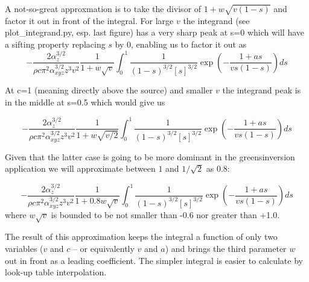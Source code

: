 \documentclass[letterpaper]{article}
\begin{document}
A not-so-great approxmation is to take the divisor of $1+w \sqrt{v(1-s)}$
and factor it out in front of the integral. For large $v$ the
integrand (see plot\_integrand.py, esp. last figure) has a very sharp peak
at s=0 which will have a sifting property replacing $s$ by $0$, enabling us to
factor it out as
\begin{equation}
-\frac{2 \alpha_{z}^{3/2}}{\rho c\pi^{2}\alpha_{xyz}^{3/2}z^{3}v^{2}} \frac{1}{1+w \sqrt{v}} \int_{0}^{1}\frac{1}{(1-s)^{3/2}\left[s\right]^{3/2}}\exp\left(-\frac{1 + as}{vs(1-s)}\right) ds
\end{equation}

At c=1 (meaning directly above the source) and smaller $v$ the integrand peak is in the middle at s=0.5 which would give us

\begin{equation}
-\frac{2 \alpha_{z}^{3/2}}{\rho c\pi^{2}\alpha_{xyz}^{3/2}z^{3}v^{2}} \frac{1}{1+w \sqrt{v/2}} \int_{0}^{1}\frac{1}{(1-s)^{3/2}\left[s\right]^{3/2}}\exp\left(-\frac{1 + as}{vs(1-s)}\right) ds
\end{equation}

Given that the latter case is going to be more dominant in the greensinversion
application we will approximate between $1$ and $1/\sqrt{2}$ as $0.8$: 

\begin{equation}
-\frac{2 \alpha_{z}^{3/2}}{\rho c\pi^{2}\alpha_{xyz}^{3/2}z^{3}v^{2}} \frac{1}{1+0.8 w \sqrt{v}} \int_{0}^{1}\frac{1}{(1-s)^{3/2}\left[s\right]^{3/2}}\exp\left(-\frac{1 + as}{vs(1-s)}\right) ds
\end{equation}
where $w\sqrt{v}$ is bounded to be not smaller than -0.6 nor greater than +1.0.

The result of this approximation keeps the integral a function of only
two variables ($v$ and $c$ -- or equivalently $v$ and $a$) and brings
the third parameter $w$ out in front as a leading coefficient. The simpler integral is easier to calculate
by look-up table interpolation. 
\end{document}
